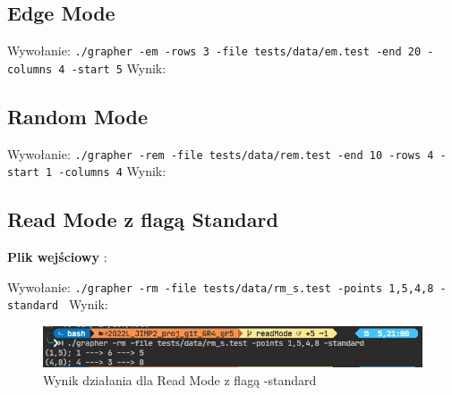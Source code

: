 \documentclass[10pt, a4paper]{report}
\begin{document}
    \subsection{Edge Mode}
    Wywołanie:
    \newline\newline \texttt{./grapher -em -rows 3 -file tests/data/em.test -end 20 -columns 4 -start 5}
    \newline\newline Wynik:    
    

    \subsection{Random Mode}
    Wywołanie:
    \newline\newline \texttt{./grapher -rem -file tests/data/rem.test -end 10 -rows 4 -start 1 -columns 4}
    \newline\newline Wynik:
    
    \newpage

    \subsection{Read Mode z flagą Standard}
    \textbf{Plik wejściowy} :
    
    Wywołanie:
    \newline\newline \texttt{./grapher -rm -file tests/data/rm\_s.test -points 1,5,4,8 -standard }
    \newline\newline Wynik:
    \begin{figure}[ht]
        \begin{center}
            \includegraphics[scale=0.8]{rm_s.png}
            \caption {Wynik działania dla Read Mode z flagą -standard}
        \end{center}
    \end{figure}
    \newpage
\end{document}
